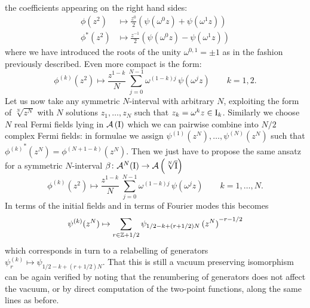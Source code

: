 the coefficients appearing on the right hand sides:
\begin{align*}
\phi(z^2)&\mapsto \frac{z^0}{2}
\left(\psi(\omega^0 z)+\psi(\omega^1 z)\right)\\
\phi^*(z^2)&\mapsto \frac{z^{-1}}{2}
\left(\psi(\omega^0 z)-\psi(\omega^1 z)\right)
\end{align*}
where we have introduced the roots of the unity $\omega^{0,1}=\pm 1$
as in the fashion previously described. Even more compact
is the form:
\begin{equation*}
\phi^{(k)}(z^2)\mapsto\frac{z^{1-k}}{N}\,\sum_{j=0}^{N-1}
\omega^{(1-k)j}\,\psi(\omega^j z)\qquad k=1,2.
\end{equation*}
Let us now take any symmetric $N$-interval with arbitrary $N$, 
exploiting the form of $\sqrt[N]{z^N}$ with $N$
solutions $z_1,\ldots,z_N$ such that $z_k=\omega^k z\in\textrm{I}_k$.
Similarly we choose $N$ real Fermi fields lying in $\mathcal{A}\left(\textrm{I}\right)$ 
which we can pairwise combine into $N/2$ complex Fermi fields:
in formulae we assign $\psi^{(1)}(z^N),\ldots,\psi^{(N)}(z^N)$
such that ${{\phi^{(k)}}^*(z^N)}=\phi^{(N+1-k)}(z^N)$.
Then we just have to propose the same ansatz 
for a symmetric $N$-interval $\beta\colon
\mathcal{A}^N(\textrm{I})\to\mathcal{A}\left(\sqrt[N]{\textrm{I}}\right)$
\begin{equation}
\label{beta_any}
\phi^{(k)}(z^2)\mapsto\frac{z^{1-k}}{N}\,\sum_{j=0}^{N-1}
\omega^{(1-k)j}\,\psi(\omega^j z)\qquad k=1,\ldots,N.
\end{equation}
In terms of the initial fields and in terms of Fourier 
modes this becomes 
\[
\psi^{(k)}(z^N)\mapsto\sum_{r\in\mathbb{Z}+1/2}\psi_{1/2-k + (r+1/2)N}\,
{(z^N)}^{-r-1/2}
\]
which corresponds in turn to a relabelling 
of generators $\psi^{(k)}_r\mapsto\psi_{1/2-k + (r+1/2)N}$.
That this is still a vacuum preserving isomorphism can be
again verified by noting that the renumbering of generators 
does not affect the vacuum, or by direct computation of the 
two-point functions, along the same lines as before.







